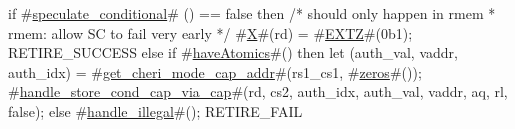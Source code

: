 if #\hyperref[sailRISCVzspeculatezyconditional]{speculate\_conditional}# () == false then {
  /* should only happen in rmem
   * rmem: allow SC to fail very early
   */
  #\hyperref[sailRISCVzX]{X}#(rd) = #\hyperref[sailRISCVzEXTZ]{EXTZ}#(0b1);
  RETIRE_SUCCESS
} else if #\hyperref[sailRISCVzhaveAtomics]{haveAtomics}#() then {
  let (auth_val, vaddr, auth_idx) = #\hyperref[sailRISCVzgetzycherizymodezycapzyaddr]{get\_cheri\_mode\_cap\_addr}#(rs1_cs1, #\hyperref[sailRISCVzzzeros]{zeros}#());
  #\hyperref[sailRISCVzhandlezystorezycondzycapzyviazycap]{handle\_store\_cond\_cap\_via\_cap}#(rd, cs2, auth_idx, auth_val, vaddr, aq, rl, false);
} else {
  #\hyperref[sailRISCVzhandlezyillegal]{handle\_illegal}#();
  RETIRE_FAIL
}
